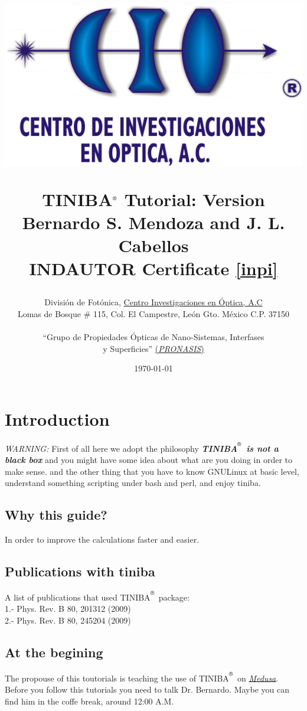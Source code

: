\documentclass[12pt,leqno]{article}
\title{
\vspace{-50pt}
\begin{center}
\includegraphics[scale=0.5]{logo-cio-nuevo.jpg}  
\vspace{10pt}
\end{center}
\vspace{12pt}
\Large{\textbf{TINIBA$^{\reg}$ Tutorial: Version \ver} \\
 Bernardo S. Mendoza and J. L. Cabellos}\\
INDAUTOR Certificate \ref{inpi} 
}
\author{{Divisi\'on de Fot\'onica, \href{http://www.cio.mx}{Centro
      Investigaciones en \'Optica, A.C }}\\
\small{Lomas de Bosque \# 115, Col. El Campestre, Le\'on Gto. M\'exico C.P. 37150}\\ 
\date{\today }
``Grupo de Propiedades \'Opticas de Nano-Sistemas, Interfases\\ y 
Superficies''
\href{http://aida.cio.mx}{(\emph{PRONASIS})} \\   
}
\def\reg{\textsuperscript{\textregistered}}
\numberwithin{equation}{section}
\begin{document}
\maketitle
\tableofcontents


\newpage
\section{Introduction}

\emph{WARNING:}
First of all here we adopt the philosophy \emph{{\bf{TINIBA$^\reg$ is
      not a black box}}} 
and you might have some idea about what are you doing in order to make sense.
and the other thing that you have to know GNU\/Linux at basic level, 
understand something  scripting under bash and perl, 
and enjoy tiniba.   
  
\subsection{Why this guide?}
In order to improve the calculations faster and easier. 

\subsection{Publications with tiniba}
 A list of publications that used TINIBA$^\reg$ package:\\
 1.- Phys. Rev. B 80, 201312 (2009) \\  
 2.- Phys. Rev. B 80, 245204 (2009) \\ 

\subsection{At the begining}
The propouse of this toutorials is teaching the use of TINIBA$^\reg$ 
on \href{http://aida.cio.mx/medusaPhotos/medusaPhoto2.jpg} {\emph{Medusa}}.\\ 
Before you follow this tutorials you need to talk  Dr. Bernardo.  
Maybe you can find him in the coffe break, around 12:00 A.M.
\end{document}
